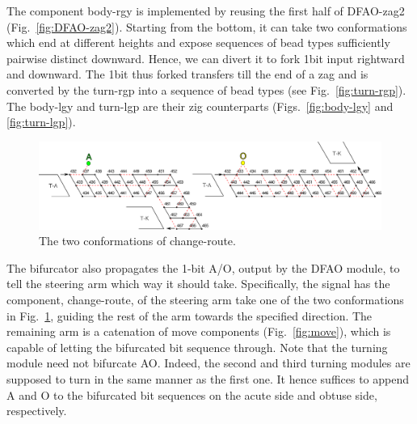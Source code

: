 The component body-rgy is implemented by reusing the first half of DFAO-zag2 (Fig.~\ref{fig:DFAO-zag2}). 
Starting from the bottom, it can take two conformations which end at different heights and expose sequences of bead types sufficiently pairwise distinct downward. 
Hence, we can divert it to fork 1bit input rightward and downward. 
The 1bit thus forked transfers till the end of a zag and is converted by the turn-rgp into a sequence of bead types (see Fig.~\ref{fig:turn-rgp}). 
The body-lgy and turn-lgp are their zig counterparts (Figs.~\ref{fig:body-lgy} and \ref{fig:turn-lgp}). 


\begin{figure}[h]
\centering
\includegraphics[width=0.9\linewidth]{pic/change-route.png}
\caption{The two conformations of change-route.}
\label{fig:change_route}
\end{figure}

The bifurcator also propagates the 1-bit A/O, output by the DFAO module, to tell the steering arm which way it should take.
Specifically, the signal has the component, change-route, of the steering arm take one of the two conformations in Fig.~\ref{fig:change_route}, guiding the rest of the arm towards the specified direction.
The remaining arm is a catenation of move components (Fig.~\ref{fig:move}), which is capable of letting the bifurcated bit sequence through.  
Note that the turning module need not bifurcate AO.
Indeed, the second and third turning modules are supposed to turn in the same manner as the first one.
It hence suffices to append A and O to the bifurcated bit sequences on the acute side and obtuse side, respectively. %

